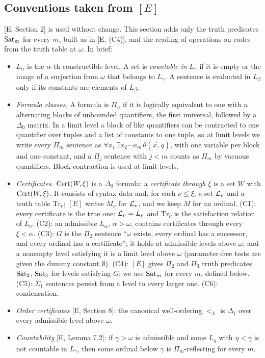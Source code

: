 \documentclass[11pt]{article}
\begin{document}
\subsection{\texorpdfstring{Conventions taken from $[E]$}{Conventions taken from [E]}}

[E, Section 2] is used without change. This section adds only the truth predicates $\mathrm{Sat}_m$ for every $m$, built as
in [E, (C4)], and the reading of operations on codes from the truth table at $\omega$. In brief:

\begin{itemize}
\item $L_\alpha$ is the $\alpha$-th constructible level. A set is \emph{countable in} $L_\gamma$ if it is empty or the
  image of a surjection from $\omega$ that belongs to $L_\gamma$. A sentence is evaluated in $L_\beta$ only if its
  constants are elements of $L_\beta$.
\item \emph{Formula classes.} A formula is $\Pi_n$ if it is logically equivalent to one with $n$ alternating blocks
  of unbounded quantifiers, the first universal, followed by a $\Delta_0$ matrix. In a limit level a block of like
  quantifiers can be contracted to one quantifier over tuples and a list of constants to one tuple, so at limit levels
  we write every $\Pi_m$ sentence as $\forall x_1\, \exists x_2 \cdots x_m\, \theta(\vec x, q)$, with one variable per
  block and one constant, and a $\Pi_j$ sentence with $j < m$ counts as $\Pi_m$ by vacuous quantifiers. Block
  contraction is used at limit levels.
\item \emph{Certificates.} $\mathrm{Cert}(W, \xi)$ is a $\Delta_0$ formula; a \emph{certificate through} $\xi$ is a set $W$
  with $\mathrm{Cert}(W,\xi)$. It consists of syntax data and, for each $\nu \le \xi$, a set $\mathcal{L}_\nu$ and a truth table
  $\mathrm{Tr}_\nu$; $[E]$ writes $M_\nu$ for $\mathcal{L}_\nu$, and we keep $M$ for an ordinal. (C1): every certificate is the
  true one: $\mathcal{L}_\nu = L_\nu$ and $\mathrm{Tr}_\nu$ is the satisfaction relation of $L_\nu$. (C2): an admissible
  $L_\alpha$, $\alpha > \omega$, contains certificates through every $\xi < \alpha$. (C3): $G$ is the $\Pi_2$ sentence
  ``$\omega$ exists, every ordinal has a successor, and every ordinal has a certificate''; it holds at admissible levels
  above $\omega$, and a nonempty level satisfying it is a limit level above $\omega$ (parameter-free tests are given the
  dummy constant $\emptyset$). (C4): $[E]$ gives $\Pi_2$ and $\Pi_3$ truth predicates $\mathrm{Sat}_2$, $\mathrm{Sat}_3$ for levels
  satisfying $G$; we use $\mathrm{Sat}_m$ for every $m$, defined below. (C5): $\Sigma_1$ sentences persist from a level to every
  larger one. (C6): condensation.
\item \emph{Order certificates} [E, Section 8]: the canonical well-ordering $<_L$ is $\Delta_1$ over every admissible
  level above $\omega$.
\item \emph{Countability} [E, Lemma 7.2]: if $\gamma > \omega$ is admissible and some $L_\eta$ with $\eta < \gamma$ is
  not countable in $L_\gamma$, then some ordinal below $\gamma$ is $\Pi_m$-reflecting for every $m$.
\end{itemize}
\end{document}
